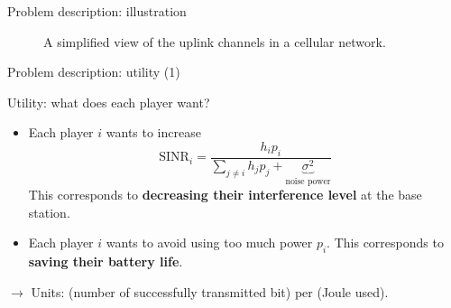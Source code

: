 \begin{frame}{Problem description: illustration}
    \begin{figure}
        \centering
        \caption{A simplified view of the uplink channels in a cellular network.}
    \end{figure}
\end{frame}

\begin{frame}{Problem description: utility (1)}
    \begin{exampleblock}{Utility: what does each player want?}
        \begin{itemize}
            \item Each player $i$ wants to increase
            \[ \text{SINR}_i = \frac{h_ip_i}{\sum_{j\neq i} h_jp_j 
                + \underbrace{\sigma^2}_\text{noise power}} \]
            This corresponds to \textbf{decreasing their interference level} at the base station.
            \item Each player $i$ wants to avoid using too much power $p_i$. This corresponds
            to \textbf{saving their battery life}.
        \end{itemize}
    \end{exampleblock}

    \vspace{0.5cm}
    $\to$ Units: (number of successfully transmitted bit) per (Joule used).
\end{frame}


